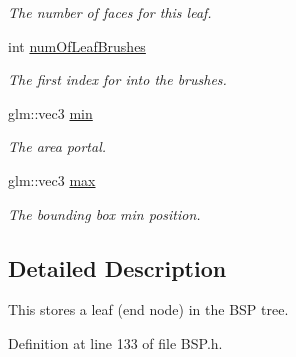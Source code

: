 \begin{DoxyCompactItemize}
\begin{DoxyCompactList}\small\item\em The number of faces for this leaf. \end{DoxyCompactList}\item 
int \hyperlink{structt_b_s_p_leaf_a678fe06069aef16fb2990a9bb757117c}{num\+Of\+Leaf\+Brushes}\hypertarget{structt_b_s_p_leaf_a678fe06069aef16fb2990a9bb757117c}{}\label{structt_b_s_p_leaf_a678fe06069aef16fb2990a9bb757117c}

\begin{DoxyCompactList}\small\item\em The first index for into the brushes. \end{DoxyCompactList}\item 
glm\+::vec3 \hyperlink{structt_b_s_p_leaf_af291c3a70d15cf834d0b3e592d652660}{min}\hypertarget{structt_b_s_p_leaf_af291c3a70d15cf834d0b3e592d652660}{}\label{structt_b_s_p_leaf_af291c3a70d15cf834d0b3e592d652660}

\begin{DoxyCompactList}\small\item\em The area portal. \end{DoxyCompactList}\item 
glm\+::vec3 \hyperlink{structt_b_s_p_leaf_a659a8a62f3d9e8df122df037348cb4a8}{max}\hypertarget{structt_b_s_p_leaf_a659a8a62f3d9e8df122df037348cb4a8}{}\label{structt_b_s_p_leaf_a659a8a62f3d9e8df122df037348cb4a8}

\begin{DoxyCompactList}\small\item\em The bounding box min position. \end{DoxyCompactList}\end{DoxyCompactItemize}


\subsection{Detailed Description}
This stores a leaf (end node) in the B\+SP tree. 

Definition at line 133 of file B\+S\+P.\+h.

